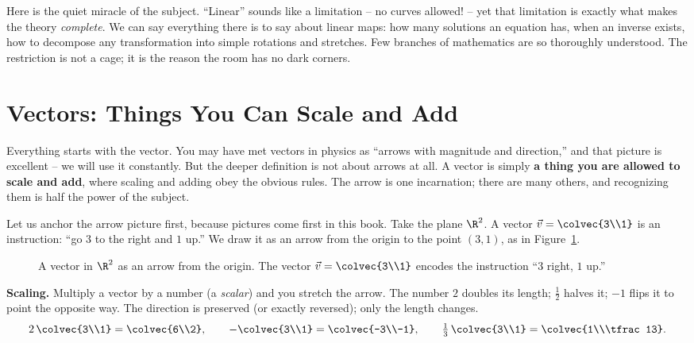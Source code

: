 \begin{aestheticbox}
Here is the quiet miracle of the subject. ``Linear'' sounds like a limitation -- no curves allowed!
-- yet that limitation is exactly what makes the theory \emph{complete}. We can say everything there
is to say about linear maps: how many solutions an equation has, when an inverse exists, how to
decompose any transformation into simple rotations and stretches. Few branches of mathematics are so
thoroughly understood. The restriction is not a cage; it is the reason the room has no dark corners.
\end{aestheticbox}

\section{Vectors: Things You Can Scale and Add}

Everything starts with the vector. You may have met vectors in physics as ``arrows with magnitude and
direction,'' and that picture is excellent -- we will use it constantly. But the deeper definition is
not about arrows at all. A vector is simply \textbf{a thing you are allowed to scale and add}, where
scaling and adding obey the obvious rules. The arrow is one incarnation; there are many others, and
recognizing them is half the power of the subject.

Let us anchor the arrow picture first, because pictures come first in this book. Take the plane $\R^2$.
A vector $\vec v = \colvec{3\\1}$ is an instruction: ``go $3$ to the right and $1$ up.'' We draw it as
an arrow from the origin to the point $(3,1)$, as in Figure~\ref{ch01:arrow}.

\begin{figure}[H]
\centering
{}
\caption{A vector in $\R^2$ as an arrow from the origin. The vector $\vec v=\colvec{3\\1}$ encodes the
instruction ``$3$ right, $1$ up.''}
\label{ch01:arrow}
\end{figure}

\textbf{Scaling.} Multiply a vector by a number (a \emph{scalar}) and you stretch the arrow. The number
$2$ doubles its length; $\tfrac12$ halves it; $-1$ flips it to point the opposite way. The direction is
preserved (or exactly reversed); only the length changes.
\[
2\,\colvec{3\\1} = \colvec{6\\2},\qquad
-\colvec{3\\1} = \colvec{-3\\-1},\qquad
\tfrac13\,\colvec{3\\1} = \colvec{1\\\tfrac13}.
\]

